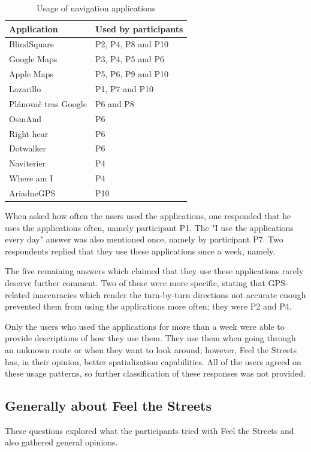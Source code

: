 \documentclass[nolof,digital]{fithesis3}
\begin{document}
\begin{table}
\caption{Usage of navigation applications}
\begin{tabularx}{\textwidth}{|X|X|}
\vspace*{0.5 cm}
\hline
Application & Used by participants \\
\hline
BlindSquare \parencite{blindsquare} & P2, P4, P8 and P10 \\
Google Maps \parencite{googlemaps} & P3, P4, P5 and P6 \\
Apple Maps \parencite{applemaps} & P5, P6, P9 and P10 \\
Lazarillo \parencite{lazarillo} & P1, P7 and P10 \\
Plánovač tras Google \parencite{ptg} & P6 and P8 \\
OsmAnd \parencite{osmand} & P6 \\
Right hear \parencite{righthear} & P6 \\
Dotwalker \parencite{dotwalker} & P6 \\
Naviterier \parencite{naviterier} & P4 \\
Where am I \parencite{whereami} & P4 \\
AriadneGPS \parencite{ariadnegps} & P10 \\
\hline
\end{tabularx}
\end{table}

When asked how often the users used the applications, one responded that he uses the applications often, namely participant P1. The "I use the applications every day" answer was also mentioned once, namely by participant P7. Two respondents replied that they use these applications once a week, namely.

The five remaining answers which claimed that they use these applications rarely deserve further comment. Two of these were more specific, stating that GPS-related inaccuracies which render the turn-by-turn directions not accurate enough prevented them from using the applications more often; they were P2 and P4.

Only the users who used the applications for more than a week were able to provide descriptions of how they use them. They use them when going through an unknown route or when they want to look around; however, Feel the Streets has, in their opinion, better spatialization capabilities. All of the users agreed on these usage patterns, so further classification of these responses was not provided.
\subsection{Generally about Feel the Streets}
These questions explored what the participants tried with Feel the Streets and also gathered general opinions.
\end{document}

